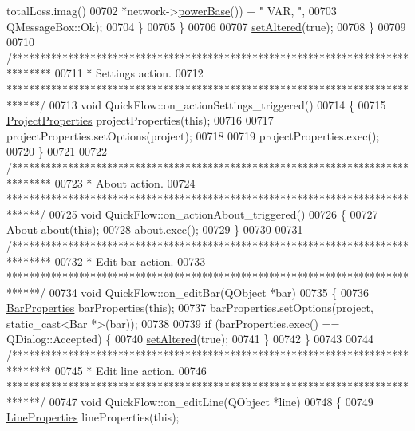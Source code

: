 \begin{DoxyCode}
      totalLoss.imag()
00702                                        *network->\hyperlink{group___models_ga6fdbd7d04d12a3f1215c92e2e20eabdb}{powerBase}()) + \textcolor{stringliteral}{" VAR, "},
00703                                QMessageBox::Ok);
00704     \}
00705   \}
00706 
00707   \hyperlink{group___window_ga4b63ea5ca52a9eea14db0a22b5a133f8}{setAltered}(\textcolor{keyword}{true});
00708 \}
00709 
00710 \textcolor{comment}{/*******************************************************************************}
00711 \textcolor{comment}{ * Settings action.}
00712 \textcolor{comment}{ ******************************************************************************/}
00713 \textcolor{keywordtype}{void} QuickFlow::on\_actionSettings\_triggered()
00714 \{
00715   \hyperlink{class_project_properties}{ProjectProperties} projectProperties(\textcolor{keyword}{this});
00716 
00717   projectProperties.setOptions(project);
00718 
00719   projectProperties.exec();
00720 \}
00721 
00722 \textcolor{comment}{/*******************************************************************************}
00723 \textcolor{comment}{ * About action.}
00724 \textcolor{comment}{ ******************************************************************************/}
00725 \textcolor{keywordtype}{void} QuickFlow::on\_actionAbout\_triggered()
00726 \{
00727   \hyperlink{class_about}{About} about(\textcolor{keyword}{this});
00728   about.exec();
00729 \}
00730 
00731 \textcolor{comment}{/*******************************************************************************}
00732 \textcolor{comment}{ * Edit bar action.}
00733 \textcolor{comment}{ ******************************************************************************/}
00734 \textcolor{keywordtype}{void} QuickFlow::on\_editBar(QObject *bar)
00735 \{
00736   \hyperlink{class_bar_properties}{BarProperties} barProperties(\textcolor{keyword}{this});
00737   barProperties.setOptions(project, static\_cast<Bar *>(bar));
00738 
00739   \textcolor{keywordflow}{if} (barProperties.exec() == QDialog::Accepted) \{
00740     \hyperlink{group___window_ga4b63ea5ca52a9eea14db0a22b5a133f8}{setAltered}(\textcolor{keyword}{true});
00741   \}
00742 \}
00743 
00744 \textcolor{comment}{/*******************************************************************************}
00745 \textcolor{comment}{ * Edit line action.}
00746 \textcolor{comment}{ ******************************************************************************/}
00747 \textcolor{keywordtype}{void} QuickFlow::on\_editLine(QObject *line)
00748 \{
00749   \hyperlink{class_line_properties}{LineProperties} lineProperties(\textcolor{keyword}{this});

\end{DoxyCode}
